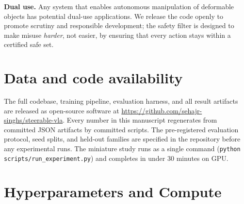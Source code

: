 \documentclass[11pt,a4paper]{article}
\begin{document}
\textbf{Dual use.} Any system that enables autonomous manipulation of deformable
objects has potential dual-use applications. We release the code openly to
promote scrutiny and responsible development; the safety filter is designed to
make misuse \emph{harder}, not easier, by ensuring that every action stays within
a certified safe set.

\section*{Data and code availability}

The full codebase, training pipeline, evaluation harness, and all result
artifacts are released as open-source software at
\url{https://github.com/sehajr-singhs/steerable-vla}. Every number in this
manuscript regenerates from committed JSON artifacts by committed scripts. The
pre-registered evaluation protocol, seed splits, and held-out families are
specified in the repository before any experimental runs. The miniature study
runs as a single command (\texttt{python scripts/run\_experiment.py}) and
completes in under 30 minutes on GPU.

\appendix

\section{Hyperparameters and Compute}
\label{app:hyper}
\end{document}
